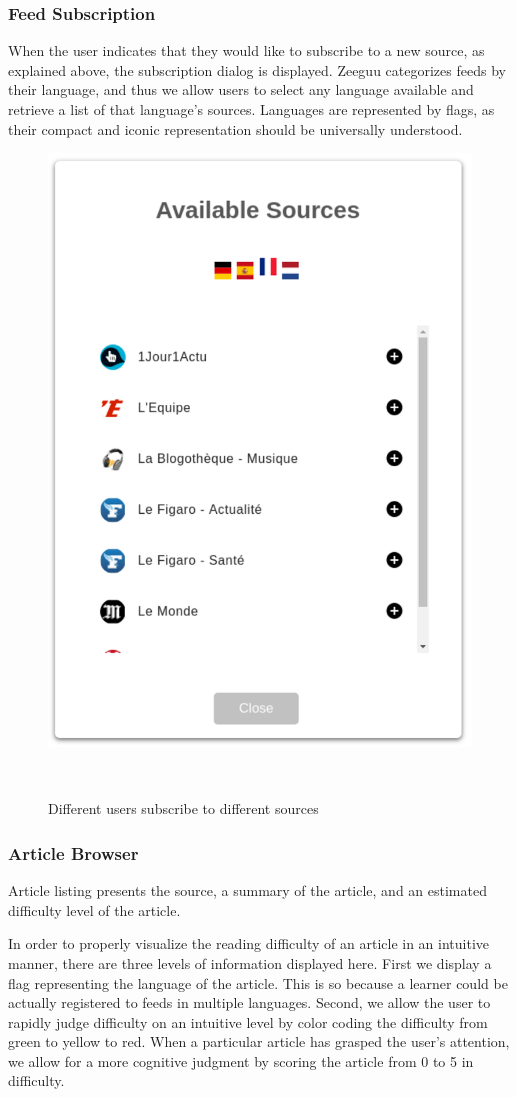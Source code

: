 \subsubsection{Feed Subscription}
When the user indicates that they would like to subscribe to a new source, as explained above, the subscription dialog is displayed. Zeeguu categorizes feeds by their language, and thus we allow users to select any language available and retrieve a list of that language's sources. Languages are represented by flags, as their compact and iconic representation should be universally understood.

\begin{figure}[h!]
\centering
  \includegraphics[width=0.4\columnwidth]{figures/available_sources}
  \caption{Different users subscribe to different sources}~\label{fig:registrations}
\end{figure}


\subsubsection{Article Browser}

Article listing presents the source, a summary of the article, and an estimated difficulty level of the article.

In order to properly visualize the reading difficulty of an article in an intuitive manner, there are three levels of information displayed here. First we display a flag representing the language of the article. This is so because a learner could be actually registered to feeds in multiple languages. Second, we allow the user to rapidly judge difficulty on an intuitive level by color coding the difficulty from green to yellow to red. When a particular article has grasped the user's attention, we allow for a more cognitive judgment by scoring the article from 0 to 5 in difficulty.

